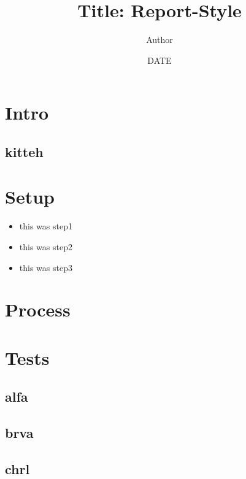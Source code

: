 \documentclass{report}
\title{Title: Report-Style}
\author{Author}
\date{DATE}
\begin{document}
\maketitle
\clearpage %

\tableofcontents
\clearpage

\section{Intro}
\lipsum[1]

\subsection{kitteh}
\lipsum[2]

\section{Setup}
\begin{itemize}[topsep=-8pt, itemsep=0pt]
\item this was step1
\item this was step2
\item this was step3
\end{itemize}

\section{Process}
\lipsum[3]

\section{Tests}
\lipsum[4]
\subsection{alfa}
\lipsum[12]
\subsection{brva}
\lipsum[13]
\subsection{chrl}
\lipsum[14]
\end{document}
